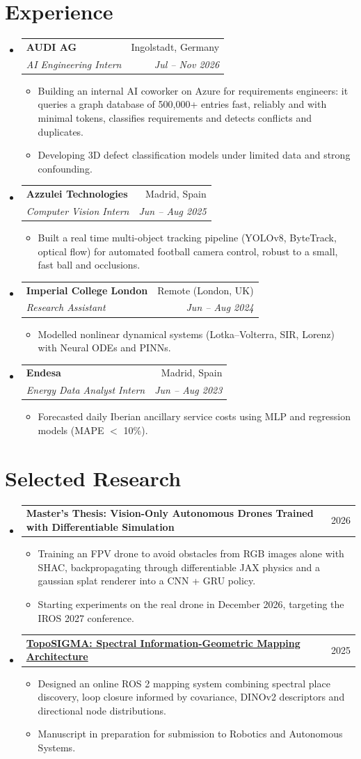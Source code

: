 \documentclass[a4paper,11pt]{article}
\makeatletter
\newcommand{\resumeItem}[1]{\item\small{{#1 \vspace{-2pt}}}}
\newcommand{\resumeSubheading}[4]{
  \vspace{-2pt}\item
    \begin{tabular*}{0.97\textwidth}[t]{l@{\extracolsep{\fill}}r}
      \textbf{#1} & #2 \\
      \textit{\small#3} & \textit{\small #4} \\
    \end{tabular*}\vspace{-7pt}
}
\newcommand{\resumeProjectHeading}[2]{
    \item
    \begin{tabular*}{0.97\textwidth}{l@{\extracolsep{\fill}}r}
      \small#1 & #2 \\
    \end{tabular*}\vspace{-7pt}
}
\newcommand{\resumeSubHeadingListStart}{\begin{itemize}[leftmargin=0.15in, label={}]}
\newcommand{\resumeSubHeadingListEnd}{\end{itemize}}
\newcommand{\resumeItemListStart}{\begin{itemize}}
\newcommand{\resumeItemListEnd}{\end{itemize}\vspace{-5pt}}
\makeatother
\begin{document}
\section{Experience}
\resumeSubHeadingListStart
\resumeSubheading
    {AUDI AG}{Ingolstadt, Germany}
    {AI Engineering Intern}{Jul -- Nov 2026}
    \resumeItemListStart
    \resumeItem{Building an internal AI coworker on Azure for requirements engineers: it queries a graph database of 500,000+ entries fast, reliably and with minimal tokens, classifies requirements and detects conflicts and duplicates.}
    \resumeItem{Developing 3D defect classification models under limited data and strong confounding.}
  \resumeItemListEnd
  \resumeSubheading
    {Azzulei Technologies}{Madrid, Spain}
    {Computer Vision Intern}{Jun -- Aug 2025}
  \resumeItemListStart
    \resumeItem{Built a real time multi-object tracking pipeline (YOLOv8, ByteTrack, optical flow) for automated football camera control, robust to a small, fast ball and occlusions.}
  \resumeItemListEnd

  \resumeSubheading
    {Imperial College London}{Remote (London, UK)}
    {Research Assistant}{Jun -- Aug 2024}
  \resumeItemListStart
    \resumeItem{Modelled nonlinear dynamical systems (Lotka--Volterra, SIR, Lorenz) with Neural ODEs and PINNs.}
  \resumeItemListEnd

  \resumeSubheading
    {Endesa}{Madrid, Spain}
    {Energy Data Analyst Intern}{Jun -- Aug 2023}
  \resumeItemListStart
    \resumeItem{Forecasted daily Iberian ancillary service costs using MLP and regression models (MAPE $<$ 10\%).}
\resumeItemListEnd
\resumeSubHeadingListEnd

\section{Selected Research}
\resumeSubHeadingListStart
  \resumeProjectHeading
    {\textbf{Master's Thesis: Vision-Only Autonomous Drones Trained with Differentiable Simulation}}{2026}
  \resumeItemListStart
    \resumeItem{Training an FPV drone to avoid obstacles from RGB images alone with SHAC, backpropagating through differentiable JAX physics and a gaussian splat renderer into a CNN + GRU policy.}
    \resumeItem{Starting experiments on the real drone in December 2026, targeting the IROS 2027 conference.}
  \resumeItemListEnd
  \resumeProjectHeading
    {\href{https://github.com/manuel-rodriguezvillegas/topo_sigma}{\textbf{TopoSIGMA: Spectral Information-Geometric Mapping Architecture}}}{2025}
  \resumeItemListStart
    \resumeItem{Designed an online ROS 2 mapping system combining spectral place discovery, loop closure informed by covariance, DINOv2 descriptors and directional node distributions.}
    \resumeItem{Manuscript in preparation for submission to Robotics and Autonomous Systems.}
  \resumeItemListEnd
\resumeSubHeadingListEnd
\end{document}
